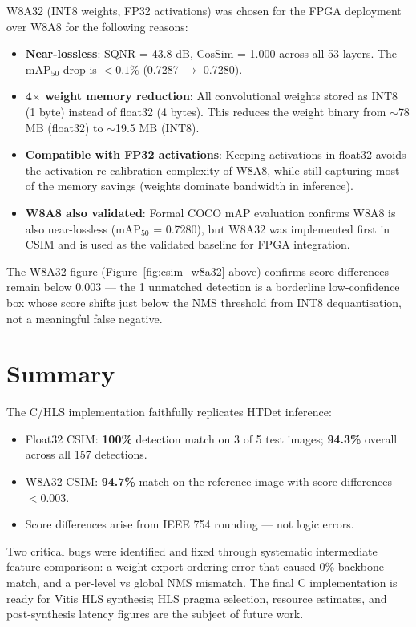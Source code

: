 W8A32 (INT8 weights, FP32 activations) was chosen for the FPGA deployment over W8A8 for the following reasons:

\begin{itemize}
    \item \textbf{Near-lossless}: SQNR = 43.8 dB, CosSim = 1.000 across all 53 layers. The mAP$_{50}$ drop is $< 0.1\%$ (0.7287 $\rightarrow$ 0.7280).
    \item \textbf{4$\times$ weight memory reduction}: All convolutional weights stored as INT8 (1 byte) instead of float32 (4 bytes). This reduces the weight binary from $\sim$78 MB (float32) to $\sim$19.5 MB (INT8).
    \item \textbf{Compatible with FP32 activations}: Keeping activations in float32 avoids the activation re-calibration complexity of W8A8, while still capturing most of the memory savings (weights dominate bandwidth in inference).
    \item \textbf{W8A8 also validated}: Formal COCO mAP evaluation confirms W8A8 is also near-lossless (mAP$_{50}$ = 0.7280), but W8A32 was implemented first in CSIM and is used as the validated baseline for FPGA integration.
\end{itemize}

The W8A32 figure (Figure~\ref{fig:csim_w8a32} above) confirms score differences remain below 0.003 — the 1 unmatched detection is a borderline low-confidence box whose score shifts just below the NMS threshold from INT8 dequantisation, not a meaningful false negative.

\section{Summary}

The C/HLS implementation faithfully replicates HTDet inference:

\begin{itemize}
    \item Float32 CSIM: \textbf{100\%} detection match on 3 of 5 test images; \textbf{94.3\%} overall across all 157 detections.
    \item W8A32 CSIM: \textbf{94.7\%} match on the reference image with score differences $< 0.003$.
    \item Score differences arise from IEEE 754 rounding — not logic errors.
\end{itemize}

Two critical bugs were identified and fixed through systematic intermediate feature comparison: a weight export ordering error that caused 0\% backbone match, and a per-level vs global NMS mismatch. The final C implementation is ready for Vitis HLS synthesis; HLS pragma selection, resource estimates, and post-synthesis latency figures are the subject of future work.
